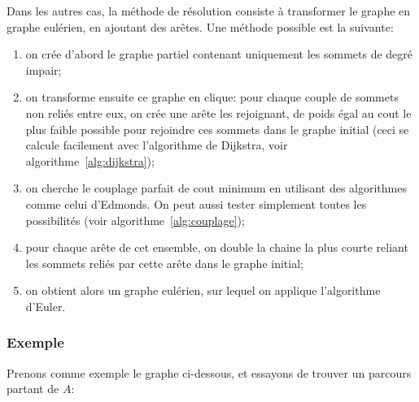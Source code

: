     Dans les autres cas, la méthode de résolution consiste à transformer le
    graphe en graphe eulérien, en ajoutant des arêtes. Une méthode possible
    est la suivante:
    \begin{enumerate}
      \item on crée d'abord le graphe partiel contenant uniquement les sommets
        de degré impair;
      \item on transforme ensuite ce graphe en clique: pour chaque couple de
        sommets non reliés entre eux, on crée une arête les rejoignant,
        de poids égal au cout le plus faible possible pour rejoindre ces
        sommets dans le graphe initial (ceci se calcule facilement avec
        l'algorithme de Dijkstra, voir algorithme~\ref{alg:dijkstra});
      \item on cherche le couplage parfait de cout minimum en utilisant des
        algorithmes comme celui d'Edmonds. On peut aussi tester simplement
        toutes les possibilités (voir algorithme~\ref{alg:couplage});
      \item pour chaque arête de cet ensemble, on double la chaine la plus
        courte reliant les sommets reliés par cette arête dans le graphe initial;
      \item on obtient alors un graphe eulérien, sur lequel on applique
        l'algorithme d'Euler.
    \end{enumerate}

  \subsubsection{Exemple}
    Prenons comme exemple le graphe ci-dessous, et essayons de trouver un parcours
    partant de $A$:

    \begin{center}
    \end{center}

